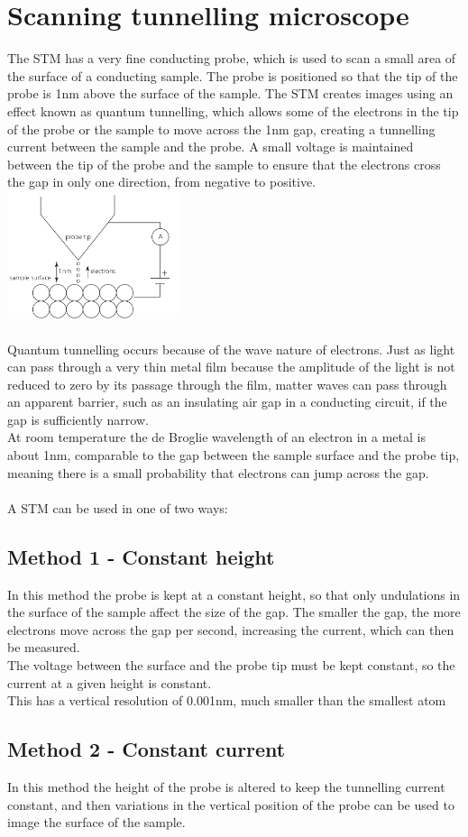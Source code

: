 \documentclass[12pt]{article}
\begin{document}
\section{Scanning tunnelling microscope}
The STM has a very fine conducting probe, which is used to scan a small area of the surface of a conducting sample. The probe is positioned so that the tip of the probe is 1nm above the surface of the sample. The STM creates images using an effect known as quantum tunnelling, which allows some of the electrons in the tip of the probe or the sample to move across the 1nm gap, creating a tunnelling current between the sample and the probe. A small voltage is maintained between the tip of the probe and the sample to ensure that the electrons cross the gap in only one direction, from negative to positive.\\
\includegraphics[width=5cm]{stm.png}\\
\\
Quantum tunnelling occurs because of the wave nature of electrons. Just as light can pass through a very thin metal film because the amplitude of the light is not reduced to zero by its passage through the film, matter waves can pass through an apparent barrier, such as an insulating air gap in a conducting circuit, if the gap is sufficiently narrow.\\
At room temperature the de Broglie wavelength of an electron in a metal is about 1nm, comparable to the gap between the sample surface and the probe tip, meaning there is a small probability that electrons can jump across the gap.\\
\\
A STM can be used in one of two ways:
\subsection{Method 1 - Constant height}
In this method the probe is kept at a constant height, so that only undulations in the surface of the sample affect the size of the gap. The smaller the gap, the more electrons move across the gap per second, increasing the current, which can then be measured.\\
The voltage between the surface and the probe tip must be kept constant, so the current at a given height is constant.\\
This has a vertical resolution of 0.001nm, much smaller than the smallest atom
\subsection{Method 2 - Constant current}
In this method the height of the probe is altered to keep the tunnelling current constant, and then variations in the vertical position of the probe can be used to image the surface of the sample.
\end{document}
